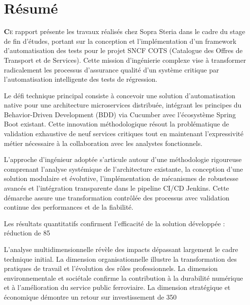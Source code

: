 \chapter*{Résumé}

\lettrine{\textbf{C}}\lowercase{e} rapport présente les travaux réalisés chez Sopra Steria dans le cadre du stage de fin d'études, portant sur la conception et l'implémentation d'un framework d'automatisation des tests pour le projet SNCF COTS (Catalogue des Offres de Transport et de Services). Cette mission d'ingénierie complexe vise à transformer radicalement les processus d'assurance qualité d'un système critique par l'automatisation intelligente des tests de régression.

Le défi technique principal consiste à concevoir une solution d'automatisation native pour une architecture microservices distribuée, intégrant les principes du Behavior-Driven Development (BDD) via Cucumber avec l'écosystème Spring Boot existant. Cette innovation méthodologique résout la problématique de validation exhaustive de neuf services critiques tout en maintenant l'expressivité métier nécessaire à la collaboration avec les analystes fonctionnels.

L'approche d'ingénieur adoptée s'articule autour d'une méthodologie rigoureuse comprenant l'analyse systémique de l'architecture existante, la conception d'une solution modulaire et évolutive, l'implémentation de mécanismes de robustesse avancés et l'intégration transparente dans le pipeline CI/CD Jenkins. Cette démarche assure une transformation contrôlée des processus avec validation continue des performances et de la fiabilité.

Les résultats quantitatifs confirment l'efficacité de la solution développée : réduction de 85%

L'analyse multidimensionnelle révèle des impacts dépassant largement le cadre technique initial. La dimension organisationnelle illustre la transformation des pratiques de travail et l'évolution des rôles professionnels. La dimension environnementale et sociétale confirme la contribution à la durabilité numérique et à l'amélioration du service public ferroviaire. La dimension stratégique et économique démontre un retour sur investissement de 350%

